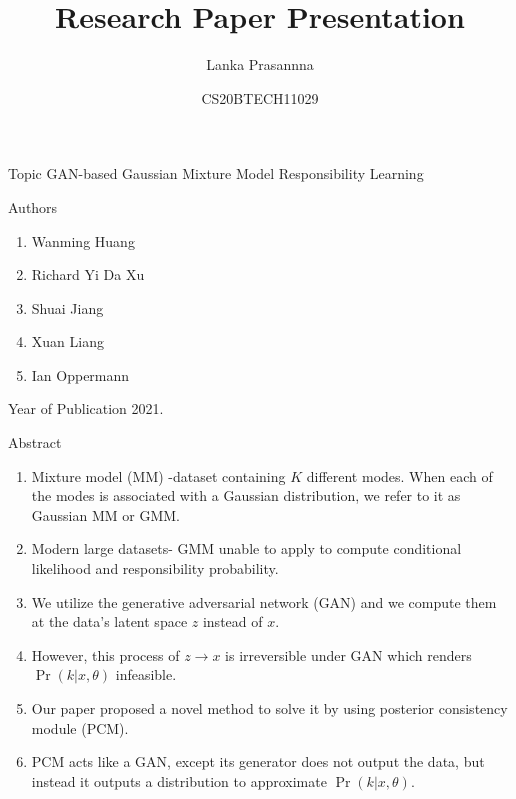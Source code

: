 \documentclass{beamer}
\title{Research Paper Presentation}
\author{Lanka Prasannna}
\date{CS20BTECH11029}
\providecommand{\pr}[1]{\ensuremath{\Pr\left(#1\right)}}
\begin{document}
%
\begin{frame}
\titlepage
\end{frame}
\begin{frame}
\begin{block}{Topic}
GAN-based Gaussian Mixture Model Responsibility Learning
\end{block}
\begin{block}{Authors}
\begin{enumerate}[]
\item Wanming Huang 
\item Richard Yi Da Xu
\item Shuai Jiang
\item Xuan Liang
\item Ian Oppermann

\end{enumerate}
\end{block}
\begin{block}{Year of Publication}
   2021.
\end{block}
\end{frame}



\begin{frame}
\begin{block}{Abstract}
\begin{enumerate}[]
\item Mixture model (MM) -dataset containing $K$ different modes. When each of the modes is associated with a Gaussian distribution, we refer to it as Gaussian MM or GMM. 
\item Modern large datasets- GMM unable to apply to compute conditional likelihood and responsibility probability.
\item We utilize the generative adversarial network (GAN) and we compute them at the data’s latent space $z$ instead of $x$.
\item However, this process of $z \rightarrow x$ is irreversible under GAN which
renders $\pr{k|x,\theta}$ infeasible.
\item Our paper proposed a novel method to solve it by using posterior consistency module (PCM).
\item PCM acts like a GAN, except its generator does not output the data, but
instead it outputs a distribution to approximate $\pr{k|x,\theta}$.
\end{enumerate}
 \end{block}
\end{frame}
\end{document}
